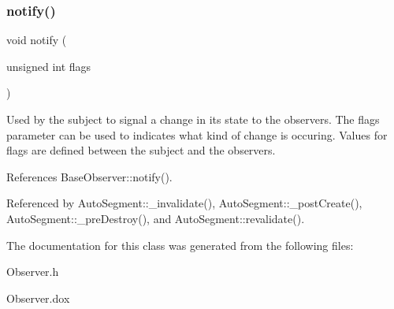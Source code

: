 \subsubsection{\texorpdfstring{notify()}{notify()}}
{\footnotesize\ttfamily void notify (\begin{DoxyParamCaption}\item[{unsigned int}]{flags }\end{DoxyParamCaption})\hspace{0.3cm}{\ttfamily [inline]}}

Used by the subject to signal a change in it\textquotesingle{}s state to the observers. The {\ttfamily flags} parameter can be used to indicates what kind of change is occuring. Values for {\ttfamily flags} are defined between the subject and the observers. 

References Base\+Observer\+::notify().



Referenced by Auto\+Segment\+::\+\_\+invalidate(), Auto\+Segment\+::\+\_\+post\+Create(), Auto\+Segment\+::\+\_\+pre\+Destroy(), and Auto\+Segment\+::revalidate().



The documentation for this class was generated from the following files\+:\begin{DoxyCompactItemize}
\item 
Observer.\+h\item 
Observer.\+dox\end{DoxyCompactItemize}
